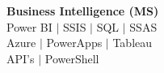 \textbf{Business Intelligence (MS)} \\
\midrule
Power BI $|$ SSIS $|$ SQL $|$ SSAS \\
Azure $|$ PowerApps $|$ Tableau \\
API's $|$ PowerShell 